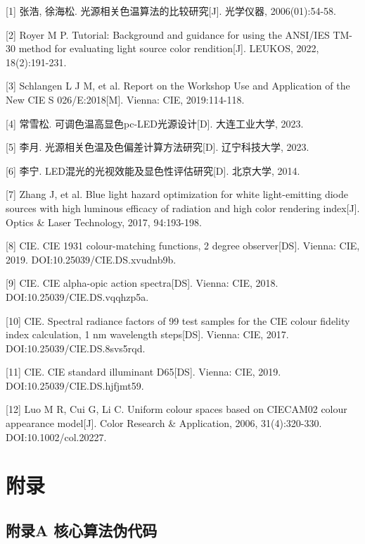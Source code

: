 \documentclass[UTF8,a4paper,12pt]{ctexart}
\begin{document}
[1] 张浩, 徐海松. 光源相关色温算法的比较研究[J]. 光学仪器, 2006(01):54-58.

[2] Royer M P. Tutorial: Background and guidance for using the ANSI/IES TM-30 method for evaluating light source color rendition[J]. LEUKOS, 2022, 18(2):191-231.

[3] Schlangen L J M, et al. Report on the Workshop Use and Application of the New CIE S 026/E:2018[M]. Vienna: CIE, 2019:114-118.

[4] 常雪松. 可调色温高显色pc-LED光源设计[D]. 大连工业大学, 2023.

[5] 李月. 光源相关色温及色偏差计算方法研究[D]. 辽宁科技大学, 2023.

[6] 李宁. LED混光的光视效能及显色性评估研究[D]. 北京大学, 2014.

[7] Zhang J, et al. Blue light hazard optimization for white light-emitting diode sources with high luminous efficacy of radiation and high color rendering index[J]. Optics \& Laser Technology, 2017, 94:193-198.

[8] CIE. CIE 1931 colour-matching functions, 2 degree observer[DS]. Vienna: CIE, 2019. DOI:10.25039/CIE.DS.xvudnb9b.

[9] CIE. CIE alpha-opic action spectra[DS]. Vienna: CIE, 2018. DOI:10.25039/CIE.DS.vqqhzp5a.

[10] CIE. Spectral radiance factors of 99 test samples for the CIE colour fidelity index calculation, 1 nm wavelength steps[DS]. Vienna: CIE, 2017. DOI:10.25039/CIE.DS.8svs5rqd.

[11] CIE. CIE standard illuminant D65[DS]. Vienna: CIE, 2019. DOI:10.25039/CIE.DS.hjfjmt59.

[12] Luo M R, Cui G, Li C. Uniform colour spaces based on CIECAM02 colour appearance model[J]. Color Research \& Application, 2006, 31(4):320-330. DOI:10.1002/col.20227.

\section{附录}

\subsection{附录A  核心算法伪代码}
\end{document}
